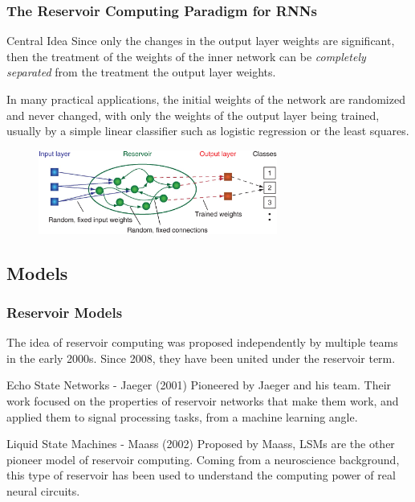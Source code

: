 \documentclass{beamer}
\begin{document}
\begin{frame}
\frametitle{The Reservoir Computing Paradigm for RNNs}
\begin{block}{Central Idea}
Since only the changes in the output layer weights are significant, then the treatment of the weights of the inner network can be {\itshape completely separated} from the treatment the output layer weights.
\end{block}

In many practical applications, the initial weights of the network are randomized and never changed, with only the weights of the output layer being trained, usually by a simple linear classifier such as logistic regression or the least squares.

\begin{figure}[!htbp]
\centering
\includegraphics[width=0.7\textwidth]{pictures/reservoir_network.png}
\label{fig:reservoir}
\end{figure}

\end{frame}


\subsection{Models}

\begin{frame}
\frametitle{Reservoir Models}
The idea of reservoir computing was proposed independently by multiple teams in the early 2000s. Since 2008, they have been united under the reservoir term.

\begin{block}{Echo State Networks - Jaeger (2001)}
Pioneered by Jaeger and his team. Their work focused on the properties of reservoir networks that make them work, and applied them to signal processing tasks, from a machine learning angle.
\end{block}

\begin{block}{Liquid State Machines - Maass (2002)}
Proposed by Maass, LSMs are the other pioneer model of reservoir computing. Coming from a neuroscience background, this type of reservoir has been used to understand the computing power of real neural circuits.
\end{block}
\end{frame}
\end{document}
